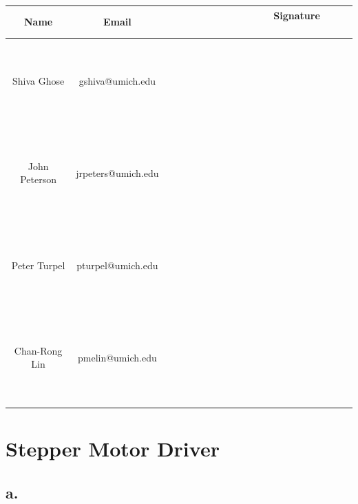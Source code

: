 \documentclass{article}
\theoremstyle{plain}
\theoremstyle{definition}
\theoremstyle{remark}
\begin{document}
\begin{table}[h]
\begin{center}
    \begin{tabular}{|c|c|c|}
        \hline
        \textbf{Name} & \textbf{Email}     & \textbf{ \ \ \ \ \  \ \  \ \ \ \ \  \ \ Signature  \ \ \ \ \  \ \ \ \ \ \ \  \ \ } \\ \hline
        	~& ~& ~\\
	~& ~& ~\\
	Shiva Ghose   & gshiva@umich.edu   & ~                  \\
	~& ~& ~\\
	~& ~& ~\\ \hline 
	~& ~& ~\\
	~& ~& ~\\
        John Peterson & jrpeters@umich.edu & ~                  \\ 
	~& ~& ~\\
	~& ~& ~\\ \hline 
	~& ~& ~\\
	~& ~& ~\\
        Peter Turpel   & pturpel@umich.edu & ~                  \\
	~& ~& ~\\
	~& ~& ~\\ \hline 
	~& ~& ~\\
	~& ~& ~\\
        Chan-Rong Lin   & pmelin@umich.edu & ~                  \\
	~& ~& ~\\
	~& ~& ~\\ \hline 
        \hline
    \end{tabular}
\end{center}
\end{table}

\newpage

\section{Stepper Motor Driver}
\subsection*{a.}
\end{document}
